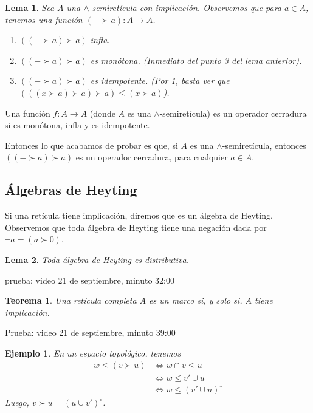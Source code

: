 \documentclass[12pt,letterpaper,titlepage]{article}
\newtheorem*{exa}{Ejemplo}
\newtheorem*{lemma}{Lema}
\newtheorem*{thm}{Teorema}
\theoremstyle{definition}
\renewcommand\inf{\wedge}
\newcommand\<{\langle}
\renewcommand\>{\rangle}
\begin{document}
\begin{lemma}
  Sea $A$ una $\inf$-semiretícula con implicación.
  Observemos que para $a\in A$, tenemos
  una función $(-\succ a):A\to A$.
  \begin{enumerate}
    \item $((-\succ a)\succ a)$ infla.
    \item $((-\succ a)\succ a)$ es monótona.
      (Inmediato del punto 3 del lema anterior).
    \item $((-\succ a)\succ a)$ es idempotente.
      (Por 1, basta ver que
      $(((x\succ a)\succ a)\succ a)\leq(x\succ a)$).
  \end{enumerate}
\end{lemma}

Una función $f:A\to A$ (donde $A$ es una $\inf$-semiretícula)
es un operador cerradura si es monótona, infla y es idempotente.

Entonces lo que acabamos de probar es que, si $A$ es una
$\inf$-semiretícula, entonces $((-\succ a)\succ a)$ es un
operador cerradura, para cualquier $a\in A$.

\subsection{Álgebras de Heyting}

Si una retícula tiene implicación, diremos que es un álgebra de
Heyting.
Observemos que toda álgebra de Heyting tiene una
negación dada por $\neg a = (a\succ 0)$.

\begin{lemma}
  Toda álgebra de Heyting es distributiva.
\end{lemma}
prueba: video 21 de septiembre, minuto 32:00

\begin{thm}
  Una retícula completa $A$ es un marco si, y solo si, $A$ tiene
  implicación.
\end{thm}
Prueba: video 21 de septiembre, minuto 39:00

\begin{exa}
  En un espacio topológico, tenemos
  \begin{align*}
    w\leq (v\succ u)
    &\iff w\cap v\leq u \\
    &\iff w\leq v'\cup u \\
    &\iff w\leq (v'\cup u)^\circ
  \end{align*}
  Luego, $v\succ u = (u\cup v')^\circ$.
\end{exa}
\end{document}
